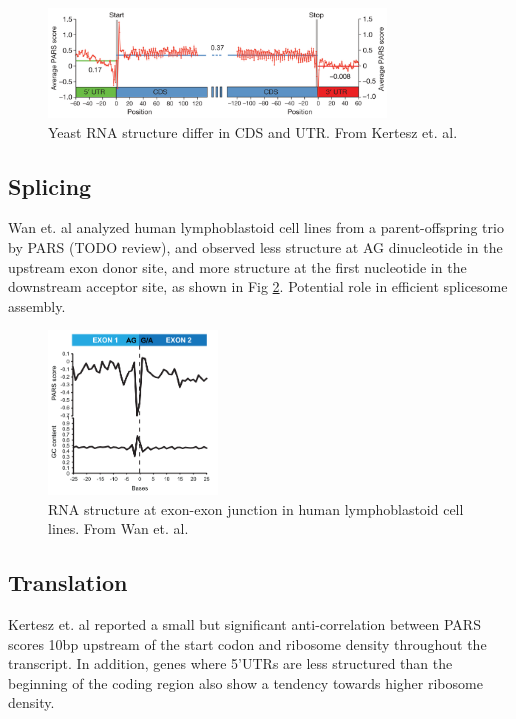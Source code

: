 \documentclass{proposal}
\begin{document}
\begin{figure}[h!]
    \centering
    \includegraphics[width=0.8\textwidth]{yeast_cds_utr.png}
    \caption{Yeast RNA structure differ in CDS and UTR. From Kertesz et. al\cite{kertesz2010genome}.}
    \label{fig:yeast_cds_utr}
    \centering
\end{figure}


\subsection*{Splicing}

Wan et. al\cite{wan2014landscape} analyzed human lymphoblastoid cell lines from a parent-offspring trio by PARS (TODO review),
and observed less structure at AG dinucleotide in the upstream exon donor site,
and more structure at the first nucleotide in the downstream acceptor site, as shown in Fig \ref{fig:exon_exon_junction}.
Potential role in efficient splicesome assembly.


\begin{figure}[h!]
    \centering
    \includegraphics[width=0.4\textwidth]{exon_exon_junction.png}
    \caption{RNA structure at exon-exon junction in human lymphoblastoid cell lines. From Wan et. al\cite{wan2014landscape}.}
    \label{fig:exon_exon_junction}
    \centering
\end{figure}


\subsection*{Translation}

Kertesz et. al\cite{kertesz2010genome} reported a small but significant anti-correlation between PARS scores 10bp upstream
of the start codon and ribosome density throughout the transcript.
In addition, genes where 5'UTRs are less structured than the beginning of the coding region also show a tendency towards higher ribosome density.
\end{document}
